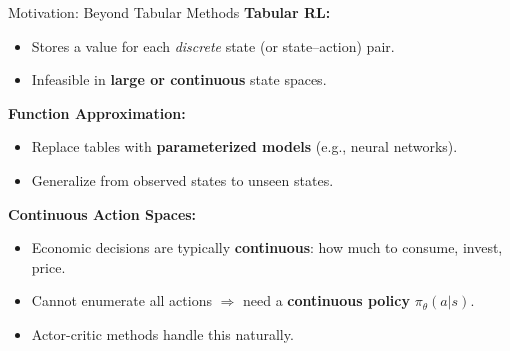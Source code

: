 \documentclass[10pt,english,aspectratio=169]{beamer}
\begin{document}
\begin{frame}{Motivation: Beyond Tabular Methods}
    \textbf{Tabular RL:}
    \begin{itemize}
        \item Stores a value for each \emph{discrete} state (or state--action) pair.
        \item Infeasible in \textbf{large or continuous} state spaces.
    \end{itemize}

    \vspace{0.3cm}
    \textbf{Function Approximation:}
    \begin{itemize}
        \item Replace tables with \textbf{parameterized models} (e.g., neural networks).
        \item Generalize from observed states to unseen states.
    \end{itemize}

    \vspace{0.3cm}
    \textbf{Continuous Action Spaces:}
    \begin{itemize}
        \item Economic decisions are typically \textbf{continuous}: how much to consume, invest, price.
        \item Cannot enumerate all actions $\Rightarrow$ need a \textbf{continuous policy} $\pi_\theta(a|s)$.
        \item Actor-critic methods handle this naturally.
    \end{itemize}
\end{frame}
\end{document}
